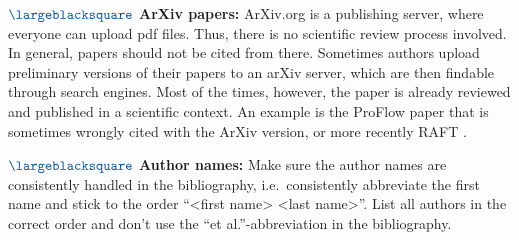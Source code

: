 \documentclass[journal]{vgtc}
\newcommand{\darksq}[1]{$\color{CD02}\largeblacksquare$ \textbf{#1:}}
\begin{document}
\darksq{ArXiv papers}
ArXiv.org is a publishing server, where everyone can upload pdf files.
Thus, there is no scientific review process involved.
In general, papers should not be cited from there.
Sometimes authors upload preliminary versions of their papers to an arXiv server, which are then findable through search engines. Most of the times, however, the paper is already reviewed and published in a scientific context.
An example is the ProFlow paper \cite{Maurer2018a} that is sometimes wrongly cited with the ArXiv version, or more recently RAFT \cite{RAFT}.

\darksq{Author names}
Make sure the author names are consistently handled in the bibliography, i.e.\ consistently abbreviate the first name and stick to the order \enquote{<first name> <last name>}.
List all authors in the correct order and don't use the \enquote{et al.}-abbreviation in the bibliography.



\end{document}
